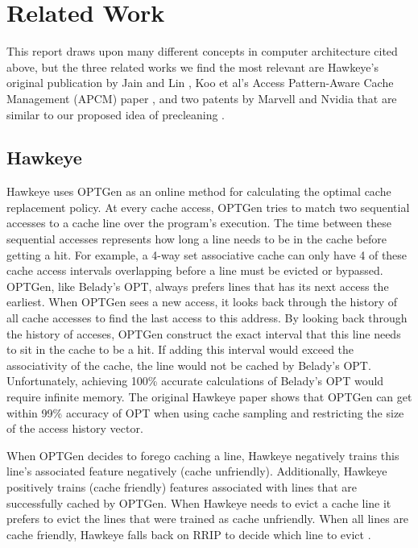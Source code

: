 \chapter{Related Work}

This report draws upon many different concepts in computer architecture cited above, but the three related works we find the most relevant are Hawkeye’s original publication by Jain and Lin \cite{hawkeye}, Koo et al’s Access Pattern-Aware Cache Management (APCM) paper \cite{apcm}, and two patents by Marvell and Nvidia that are similar to our proposed idea of precleaning \cite{preclean_cpu,preclean_nvidia_patent}.

\section{Hawkeye}
Hawkeye uses OPTGen as an online method for calculating the optimal cache replacement policy. At every cache access, OPTGen tries to match two sequential accesses to a cache line over the program's execution. The time between these sequential accesses represents how long a line needs to be in the cache before getting a hit. For example, a 4-way set associative cache can only have 4 of these cache access intervals overlapping before a line must be evicted or bypassed. OPTGen, like Belady’s OPT, always prefers lines that has its next access the earliest. When OPTGen sees a new access, it looks back through the history of all cache accesses to find the last access to this address. By looking back through the history of acceses, OPTGen construct the exact interval that this line needs to sit in the cache to be a hit. If adding this interval would exceed the associativity of the cache, the line would not be cached by Belady's OPT. Unfortunately, achieving 100\% accurate calculations of Belady's OPT would require infinite memory. The original Hawkeye paper shows that OPTGen can get within 99\% accuracy of OPT when using cache sampling and restricting the size of the access history vector.

When OPTGen decides to forego caching a line, Hawkeye negatively trains this line’s associated feature negatively (cache unfriendly). Additionally, Hawkeye positively trains (cache friendly) features associated with lines that are successfully cached by OPTGen. When Hawkeye needs to evict a cache line it prefers to evict the lines that were trained as cache unfriendly. When all lines are cache friendly, Hawkeye falls back on RRIP to decide which line to evict \cite{rrip}. 

